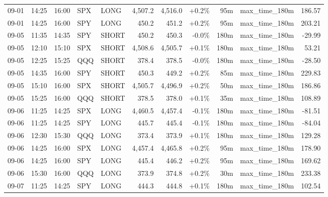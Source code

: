 \documentclass[11pt,a4paper,twoside]{article}
\begin{document}
\begin{center}
\begin{longtable}{>{\color{txtmain}}l l l l l r r r r >{\color{txtmain}}l r}
09-01 & 14:25 & 16:00 & SPX & LONG & 4,507.2 & 4,516.0 & \textcolor{wingreen}{+0.2\%} & 95m & max\_time\_180m & \textcolor{wingreen}{186.57} \\
09-01 & 14:25 & 16:00 & SPY & LONG & 450.2 & 451.2 & \textcolor{wingreen}{+0.2\%} & 95m & max\_time\_180m & \textcolor{wingreen}{203.21} \\
09-05 & 11:35 & 14:35 & SPY & SHORT & 450.2 & 450.3 & \textcolor{lossred}{-0.0\%} & 180m & max\_time\_180m & \textcolor{lossred}{-29.99} \\
09-05 & 12:10 & 15:10 & SPX & SHORT & 4,508.6 & 4,505.7 & \textcolor{wingreen}{+0.1\%} & 180m & max\_time\_180m & \textcolor{wingreen}{53.21} \\
09-05 & 12:25 & 15:25 & QQQ & SHORT & 378.4 & 378.5 & \textcolor{lossred}{-0.0\%} & 180m & max\_time\_180m & \textcolor{lossred}{-28.50} \\
09-05 & 14:35 & 16:00 & SPY & SHORT & 450.3 & 449.2 & \textcolor{wingreen}{+0.2\%} & 85m & max\_time\_180m & \textcolor{wingreen}{229.83} \\
09-05 & 15:10 & 16:00 & SPX & SHORT & 4,505.7 & 4,496.9 & \textcolor{wingreen}{+0.2\%} & 50m & max\_time\_180m & \textcolor{wingreen}{186.86} \\
09-05 & 15:25 & 16:00 & QQQ & SHORT & 378.5 & 378.0 & \textcolor{wingreen}{+0.1\%} & 35m & max\_time\_180m & \textcolor{wingreen}{108.89} \\
09-06 & 11:25 & 14:25 & SPX & LONG & 4,460.5 & 4,457.4 & \textcolor{lossred}{-0.1\%} & 180m & max\_time\_180m & \textcolor{lossred}{-81.51} \\
09-06 & 11:25 & 14:25 & SPY & LONG & 445.7 & 445.4 & \textcolor{lossred}{-0.1\%} & 180m & max\_time\_180m & \textcolor{lossred}{-84.04} \\
09-06 & 12:30 & 15:30 & QQQ & LONG & 373.4 & 373.9 & \textcolor{wingreen}{+0.1\%} & 180m & max\_time\_180m & \textcolor{wingreen}{129.28} \\
09-06 & 14:25 & 16:00 & SPX & LONG & 4,457.4 & 4,465.8 & \textcolor{wingreen}{+0.2\%} & 95m & max\_time\_180m & \textcolor{wingreen}{178.90} \\
09-06 & 14:25 & 16:00 & SPY & LONG & 445.4 & 446.2 & \textcolor{wingreen}{+0.2\%} & 95m & max\_time\_180m & \textcolor{wingreen}{169.62} \\
09-06 & 15:30 & 16:00 & QQQ & LONG & 373.9 & 374.8 & \textcolor{wingreen}{+0.2\%} & 30m & max\_time\_180m & \textcolor{wingreen}{233.38} \\
09-07 & 11:25 & 14:25 & SPY & LONG & 444.3 & 444.8 & \textcolor{wingreen}{+0.1\%} & 180m & max\_time\_180m & \textcolor{wingreen}{102.54} \\

\end{longtable}
\end{center}
\end{document}
